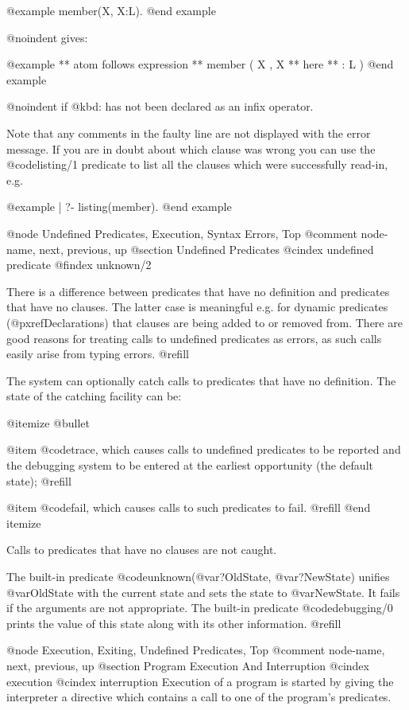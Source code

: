 @example
member(X, X:L).
@end example

@noindent
gives:

@example
** atom follows expression **
member ( X , X
** here **
: L )
@end example

@noindent
if @kbd{:} has not been declared as an infix operator.

Note that any comments in the faulty line are not displayed with the error
message.  If you are in doubt about which clause was wrong you can use the
@code{listing/1} predicate to list all the clauses which were successfully
read-in, e.g.

@example
| ?- listing(member).
@end example

@node Undefined Predicates, Execution, Syntax Errors, Top
@comment  node-name,  next,  previous,  up
@section Undefined Predicates
@cindex undefined predicate
@findex unknown/2

There is a difference between predicates that have no definition and
predicates that have no clauses.  The latter case is meaningful e.g.
for dynamic predicates (@pxref{Declarations}) that clauses are being
added to or removed from.  There are good reasons for treating calls to
undefined predicates as errors, as such calls easily arise from typing
errors. @refill

The system can optionally catch calls to predicates that have no
definition.  The state of the catching facility can be:

@itemize @bullet

@item
@code{trace}, which causes calls to undefined predicates to be
reported and the debugging system to be entered at the earliest
opportunity (the default state); @refill

@item
@code{fail}, which causes calls to such predicates to fail. @refill
@end itemize

Calls to predicates that have no clauses are not caught.

The built-in predicate @code{unknown(@var{?OldState}, @var{?NewState})}
unifies @var{OldState} with the current state and sets the state to
@var{NewState}.  It fails if the arguments are not appropriate.  The
built-in predicate @code{debugging/0} prints the value of this state
along with its other information.  @refill

@node Execution, Exiting, Undefined Predicates, Top
@comment  node-name,  next,  previous,  up
@section Program Execution And Interruption
@cindex execution
@cindex interruption
Execution of a program is started by giving the interpreter a directive
which contains a call to one of the program's predicates.

